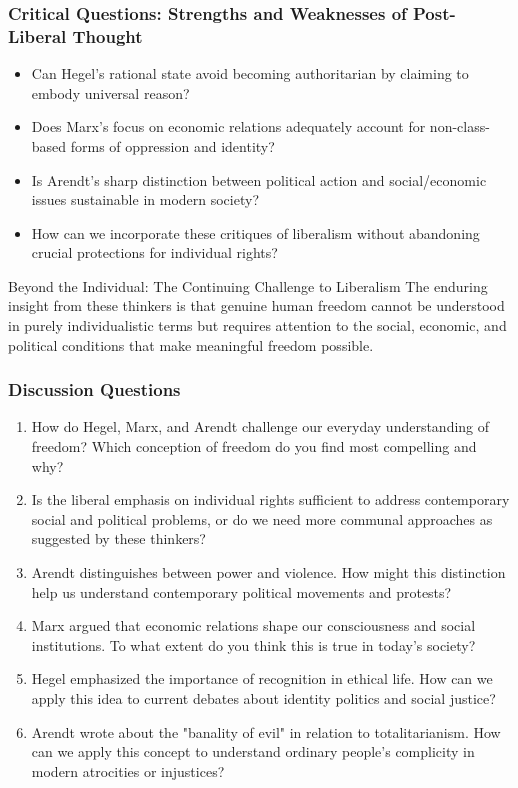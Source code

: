 \documentclass{beamer}
\begin{document}
\begin{frame}
\frametitle{Critical Questions: Strengths and Weaknesses of Post-Liberal Thought}
\begin{itemize}
    \item Can Hegel's rational state avoid becoming authoritarian by claiming to embody universal reason?
    \item Does Marx's focus on economic relations adequately account for non-class-based forms of oppression and identity?
    \item Is Arendt's sharp distinction between political action and social/economic issues sustainable in modern society?
    \item How can we incorporate these critiques of liberalism without abandoning crucial protections for individual rights?
\end{itemize}

\begin{alertblock}{Beyond the Individual: The Continuing Challenge to Liberalism}
The enduring insight from these thinkers is that genuine human freedom cannot be understood in purely individualistic terms but requires attention to the social, economic, and political conditions that make meaningful freedom possible.
\end{alertblock}
\end{frame}


\begin{frame}
    \frametitle{Discussion Questions}
    \begin{enumerate}
        \small
        \item How do Hegel, Marx, and Arendt challenge our everyday understanding of freedom? Which conception of freedom do you find most compelling and why?
        
        \item Is the liberal emphasis on individual rights sufficient to address contemporary social and political problems, or do we need more communal approaches as suggested by these thinkers?
        
        \item Arendt distinguishes between power and violence. How might this distinction help us understand contemporary political movements and protests?
        
        \item Marx argued that economic relations shape our consciousness and social institutions. To what extent do you think this is true in today's society?
        
        \item Hegel emphasized the importance of recognition in ethical life. How can we apply this idea to current debates about identity politics and social justice?
        
        \item Arendt wrote about the "banality of evil" in relation to totalitarianism. How can we apply this concept to understand ordinary people's complicity in modern atrocities or injustices?
    \end{enumerate}
    
    \end{frame}
\end{document}
